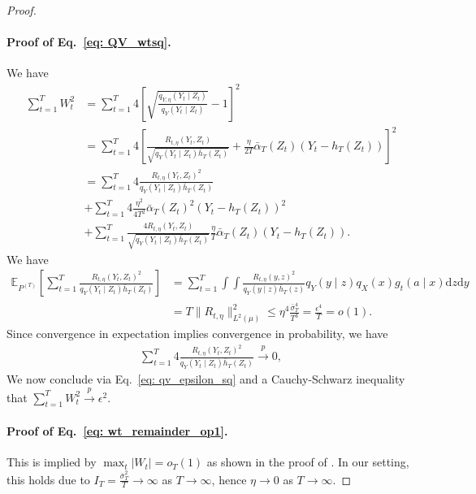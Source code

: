 \documentclass[11pt]{article}
\begin{document}
\begin{proof}
    \paragraph{Proof of Eq.~\eqref{eq: QV_wtsq}.} We have
    \begin{align*}
        \sum_{t=1}^{T}W_t^2 &= \sum_{t=1}^{T}4\left[\sqrt{\frac{q_{Y,\eta}(Y_t\mid Z_t)}{q_Y(Y_t\mid Z_t)}} - 1\right]^2\\
        &= \sum_{t=1}^{T}4\left[\frac{R_{t,\eta}(Y_t, Z_t)}{\sqrt{q_Y(Y_t\mid Z_t)\bar{h}_T(Z_t)}} + \frac{\eta}{2T}\bar{\alpha}_T(Z_t)(Y_t - h_T(Z_t))\right]^2\\
        &= \sum_{t=1}^{T}4\frac{R_{t,\eta}(Y_t, Z_t)^2}{q_Y(Y_t\mid Z_t)\bar{h}_T(Z_t)}\\
        &+ \sum_{t=1}^{T}4\frac{\eta^2}{4T^2}\bar{\alpha}_T(Z_t)^2(Y_t - h_T(Z_t))^2\\
        &+ \sum_{t=1}^{T}\frac{4R_{t,\eta}(Y_t, Z_t)}{\sqrt{q_Y(Y_t\mid Z_t)\bar{h}_T(Z_t)}}\frac{\eta}{T}\bar{\alpha}_T(Z_t)(Y_t - h_T(Z_t)). 
    \end{align*}
    We have
    \begin{align*}
        \mathbb{E}_{P^{(T)}}\left[\sum_{t=1}^{T}\frac{R_{t,\eta}(Y_t, Z_t)^2}{q_Y(Y_t\mid Z_t)\bar{h}_T(Z_t)}\right] &= \sum_{t=1}^{T}\int\int \frac{R_{t,\eta}(y,z)^2}{q_Y(y\mid z)\bar{h}_T(z)}q_Y(y\mid z)q_X(x)g_t(a\mid x)\mathrm{d}z\mathrm{d}y\\
        &= T\|R_{t,\eta}\|^2_{L^2(\mu)} \leq \eta^4\frac{\bar{\sigma}_T^4}{T^3} = \frac{\epsilon^4}{T} = o(1). 
    \end{align*}
    Since convergence in expectation implies convergence in probability, we have
    \begin{align*}
        \sum_{t=1}^{T}4\frac{R_{t,\eta}(Y_t, Z_t)^2}{q_Y(Y_t\mid Z_t)\bar{h}_T(Z_t)} \overset{p}{\rightarrow} 0,
    \end{align*}
    We now conclude via Eq.~\eqref{eq: qv_epsilon_sq} and a Cauchy-Schwarz inequality that $\sum_{t=1}^{T}W_t^2 \overset{p}{\rightarrow} \epsilon^2$. 
    
    \paragraph{Proof of Eq.~\eqref{eq: wt_remainder_op1}. } This is implied by $\max_{t}|W_t| = o_T(1)$ as shown in the proof of \citet[Theorem 7.2]{vanderVaart1998asymptotic}. In our setting, this holds due to $I_T = \frac{\bar{\sigma}_T^2}{T} \to \infty$ as $T\to \infty$, hence $\eta \to 0$ as $T\to \infty$.  
\end{proof}
\end{document}
